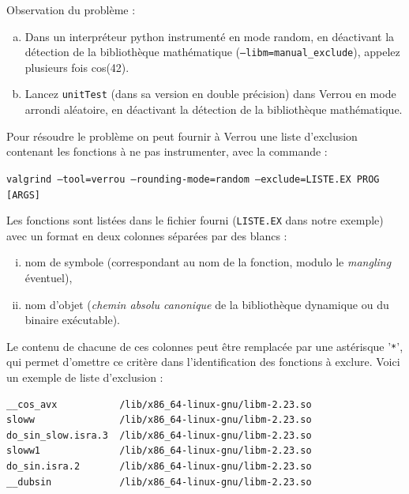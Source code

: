 \documentclass[a4paper]{article}
\def\mdfilename{File}
\newenvironment{file}[1][Fichier]{
  \def\mdfilename{#1}
  \begin{mdframed}[style=file]
}{
  \end{mdframed}
}
\newcounter{Question}
\newenvironment{question}[1][\unskip]{
  \bigskip
  \stepcounter{Question}
  \def\questionTitle{ #1}
  \begin{mdframed}[style=question]
  }{
  \end{mdframed}
}
\begin{document}
\begin{question}
  Observation du problème :
  \begin{enumerate}[(a)]
  \item Dans un interpréteur python instrumenté en mode random, en déactivant la détection de la bibliothèque mathématique (\texttt{--libm=manual\_exclude}), appelez plusieurs fois cos(42).
  \item Lancez \texttt{unitTest} (dans sa version en double précision) dans Verrou en mode arrondi aléatoire,  en déactivant la détection de la bibliothèque mathématique.
  \end{enumerate}
\end{question}

Pour résoudre le problème on peut fournir à Verrou une liste d'exclusion contenant les fonctions à ne pas
instrumenter, avec la commande :

\strut\qquad\texttt{valgrind --tool=verrou --rounding-mode=random
  --exclude=LISTE.EX PROG [ARGS]}

\medskip

\noindent Les fonctions sont listées dans le fichier fourni (\texttt{LISTE.EX}
dans notre exemple) avec un format en deux colonnes séparées par des blancs :
\begin{enumerate}[(i)]
\item nom de symbole (correspondant au nom de la fonction, modulo le
  \textit{mangling} éventuel),
\item nom d'objet (\emph{chemin absolu canonique} de la bibliothèque dynamique ou du
  binaire exécutable).
\end{enumerate}
Le contenu de chacune de ces colonnes peut être remplacée par une astérisque
'\texttt{*}', qui permet d'omettre ce critère dans l'identification des
fonctions à exclure. Voici un exemple de liste d'exclusion :
%
\begin{file}[libm.ex]
\begin{verbatim}
__cos_avx           /lib/x86_64-linux-gnu/libm-2.23.so
sloww               /lib/x86_64-linux-gnu/libm-2.23.so
do_sin_slow.isra.3  /lib/x86_64-linux-gnu/libm-2.23.so
sloww1              /lib/x86_64-linux-gnu/libm-2.23.so
do_sin.isra.2       /lib/x86_64-linux-gnu/libm-2.23.so
__dubsin            /lib/x86_64-linux-gnu/libm-2.23.so
\end{verbatim}
\end{file}
\end{document}
